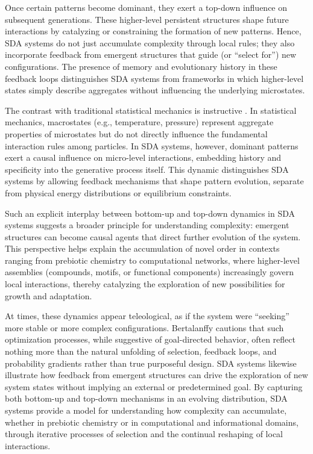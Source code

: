 \documentclass[preprint,12pt]{elsarticle}
\begin{document}
Once certain patterns become dominant, they exert a top-down influence on subsequent generations. These higher-level persistent structures shape future interactions by catalyzing or constraining the formation of new patterns. Hence, SDA systems do not just accumulate complexity through local rules; they also incorporate feedback from emergent structures that guide (or ``select for'') new configurations. The presence of memory and evolutionary history in these feedback loops distinguishes SDA systems from frameworks in which higher-level states simply describe aggregates without influencing the underlying microstates.

The contrast with traditional statistical mechanics is instructive \cite{landau1980statistical}. In statistical mechanics, macrostates (e.g., temperature, pressure) represent aggregate properties of microstates but do not directly influence the fundamental interaction rules among particles. In SDA systems, however, dominant patterns exert a causal influence on micro-level interactions, embedding history and specificity into the generative process itself. This dynamic distinguishes SDA systems by allowing feedback mechanisms that shape pattern evolution, separate from physical energy distributions or equilibrium constraints.

Such an explicit interplay between bottom-up and top-down dynamics in SDA systems suggests a broader principle for understanding complexity: emergent structures can become causal agents that direct further evolution of the system. This perspective helps explain the accumulation of novel order in contexts ranging from prebiotic chemistry to computational networks, where higher-level assemblies (compounds, motifs, or functional components) increasingly govern local interactions, thereby catalyzing the exploration of new possibilities for growth and adaptation.

At times, these dynamics appear teleological, as if the system were ``seeking'' more stable or more complex configurations. Bertalanffy \cite{bertalanffy1968general} cautions that such optimization processes, while suggestive of goal-directed behavior, often reflect nothing more than the natural unfolding of selection, feedback loops, and probability gradients rather than true purposeful design. SDA systems likewise illustrate how feedback from emergent structures can drive the exploration of new system states without implying an external or predetermined goal. By capturing both bottom-up and top-down mechanisms in an evolving distribution, SDA systems provide a model for understanding how complexity can accumulate, whether in prebiotic chemistry or in computational and informational domains, through iterative processes of selection and the continual reshaping of local interactions.
\end{document}
